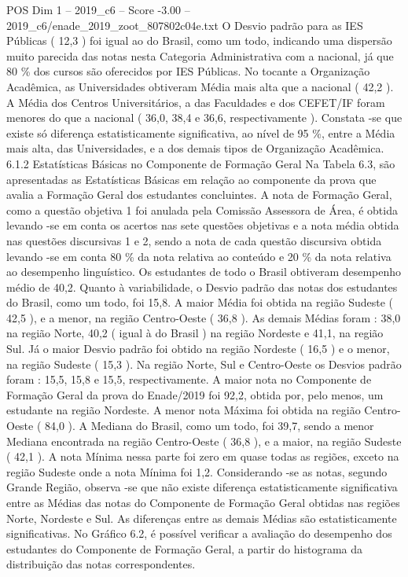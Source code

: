 \begin{textsample}{POS Dim 1 – 2019\_c6 – Score -3.00 – 2019\_c6/enade\_2019\_zoot\_807802c04e.txt}
O Desvio padrão para as IES Públicas ( 12,3 ) foi igual ao do Brasil, como um todo, indicando uma dispersão muito parecida das notas nesta Categoria Administrativa com a nacional, já que 80 \% dos cursos são oferecidos por IES Públicas.
No tocante a Organização Acadêmica, as Universidades obtiveram Média mais alta que a nacional ( 42,2 ).
A Média dos Centros Universitários, a das Faculdades e dos CEFET/IF foram menores do que a nacional ( 36,0, 38,4 e 36,6, respectivamente ).
Constata -se que existe só diferença estatisticamente significativa, ao nível de 95 \%, entre a Média mais alta, das Universidades, e a dos demais tipos de Organização Acadêmica. 6.1.2 Estatísticas Básicas no Componente de Formação Geral Na Tabela 6.3, são apresentadas as Estatísticas Básicas em relação ao componente da prova que avalia a Formação Geral dos estudantes concluintes.
A nota de Formação Geral, como a questão objetiva 1 foi anulada pela Comissão Assessora de Área, é obtida levando -se em conta os acertos nas sete questões objetivas e a nota média obtida nas questões discursivas 1 e 2, sendo a nota de cada questão discursiva obtida levando -se em conta 80 \% da nota relativa ao conteúdo e 20 \% da nota relativa ao desempenho linguístico.
Os estudantes de todo o Brasil obtiveram desempenho médio de 40,2.
Quanto à variabilidade, o Desvio padrão das notas dos estudantes do Brasil, como um todo, foi 15,8.
A maior Média foi obtida na região Sudeste ( 42,5 ), e a menor, na região Centro-Oeste ( 36,8 ).
As demais Médias foram : 38,0 na região Norte, 40,2 ( igual à do Brasil ) na região Nordeste e 41,1, na região Sul.
Já o maior Desvio padrão foi obtido na região Nordeste ( 16,5 ) e o menor, na região Sudeste ( 15,3 ).
Na região Norte, Sul e Centro-Oeste os Desvios padrão foram : 15,5, 15,8 e 15,5, respectivamente.
A maior nota no Componente de Formação Geral da prova do Enade/2019 foi 92,2, obtida por, pelo menos, um estudante na região Nordeste.
A menor nota Máxima foi obtida na região Centro-Oeste ( 84,0 ).
A Mediana do Brasil, como um todo, foi 39,7, sendo a menor Mediana encontrada na região Centro-Oeste ( 36,8 ), e a maior, na região Sudeste ( 42,1 ).
A nota Mínima nessa parte foi zero em quase todas as regiões, exceto na região Sudeste onde a nota Mínima foi 1,2.
Considerando -se as notas, segundo Grande Região, observa -se que não existe diferença estatisticamente significativa entre as Médias das notas do Componente de Formação Geral obtidas nas regiões Norte, Nordeste e Sul.
As diferenças entre as demais Médias são estatisticamente significativas.
No Gráfico 6.2, é possível verificar a avaliação do desempenho dos estudantes do Componente de Formação Geral, a partir do histograma da distribuição das notas correspondentes.

\end{textsample}
